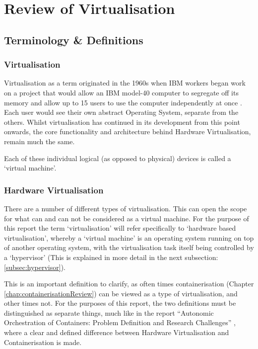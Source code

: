 
\chapter{Review of Virtualisation}
\label{chap:virtualisationReview}

\section{Terminology \& Definitions}


\subsection{Virtualisation}
Virtualisation as a term originated in the 1960s when IBM workers began work on a project that would allow an IBM model-40 computer to segregate off its memory and allow up to 15 users to use the computer independently at once \citep{Lindquist1966}. Each user would see their own abstract Operating System, separate from the others. Whilst virtualisation has continued in its development from this point onwards, the core functionality and architecture behind Hardware Virtualisation, remain much the same.

Each of these individual logical (as opposed to physical) devices is called a `virtual machine'.

\subsection{Hardware Virtualisation}
\label{subsec:HardwareVirtualisation}
There are a number of different types of virtualisation. This can open the scope for what can and can not be considered as a virtual machine. For the purpose of this report the term `virtualisation' will refer specifically to `hardware based virtualisation', whereby a `virtual machine' is an operating system running on top of another operating system, with the virtualisation task itself being controlled by a `hypervisor' (This is explained in more detail in the next subsection: \ref{subsec:hypervisor}).

This is an important definition to clarify, as often times containerisation (Chapter \ref{chap:containerisationReview}) can be viewed as a type of virtualisation, and other times not. For the purposes of this report, the two definitions must be distinguished as separate things, much like in the report ``Autonomic Orchestration of Containers: Problem Definition and Research Challenges'' \citep{casalicchio2016}, where a clear and defined difference between Hardware Virtualisation and Containerisation is made.

